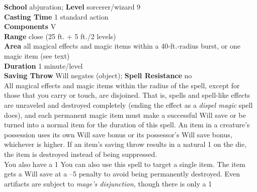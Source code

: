 \textbf{School }abjuration; \textbf{Level }sorcerer/wizard 9\\
\textbf{Casting Time }1 standard action\\
\textbf{Components }V\\
\textbf{Range }close (25 ft. + 5 ft./2 levels)\\
\textbf{Area }all magical effects and magic items within a 40-ft.-radius burst, or one magic item (see text)\\
\textbf{Duration }1 minute/level\\
\textbf{Saving Throw} Will negates (object); \textbf{Spell Resistance} no\\
All magical effects and magic items within the radius of the spell, except for those that you carry or touch, are disjoined. That is, spells and spell-like effects are unraveled and destroyed completely (ending the effect as a \textit{dispel magic }spell does), and each permanent magic item must make a successful Will save or be turned into a normal item for the duration of this spell. An item in a creature's possession uses its own Will save bonus or its possessor's Will save bonus, whichever is higher. If an item's saving throw results in a natural 1 on the die, the item is destroyed instead of being suppressed.\\
You also have a 1%
You can also use this spell to target a single item. The item gets a Will save at a --5 penalty to avoid being permanently destroyed. Even artifacts are subject to \textit{mage's disjunction, }though there is only a 1%
